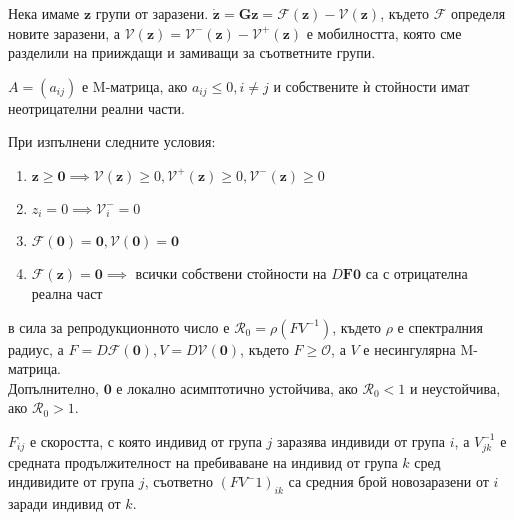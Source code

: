 Нека имаме $\mathbf{z}$ групи от заразени. $\dot{\mathbf{z}} = \mathbf{G}{\mathbf{z}} = \mathscr{F}(\mathbf{z}) - \mathscr{V}(\mathbf{z})$, където $\mathscr{F}$ определя новите заразени, а $\mathscr{V}(\mathbf{z}) = \mathscr{V}^-(\mathbf{z}) - \mathscr{V}^+(\mathbf{z})$ е мобилността, която сме разделили на прииждащи и замиващи за съответните групи.

\begin{definition}[M-матрица]
  $A = (a_{ij})$ е M-матрица, ако $a_{ij} \leq 0, i \neq j$ и собствените ѝ стойности имат неотрицателни реални части.
\end{definition}
\begin{theorem}
  При изпълнени следните условия:
  \begin{enumerate}
    \item $\mathbf{z} \geq \mathbf{0} \implies \mathscr{V}(\mathbf{z}) \geq 0, \mathscr{V}^+(\mathbf{z}) \geq 0, \mathscr{V}^-(\mathbf{z}) \geq 0$
    \item $z_i = 0 \implies \mathscr{V}_{i}^- = 0$
    \item $\mathscr{F}(\mathbf{0}) = \mathbf{0}, \mathscr{V}(\mathbf{0}) = \mathbf{0}$
    \item $\mathscr{F}(\mathbf{z}) = \mathbf{0} \implies$ всички собствени стойности на $D\mathbf{F}{\mathbf{0}}$ са с отрицателна реална част
  \end{enumerate}
  в сила за репродукционното число е $\mathscr{R}_0 = \rho(F V^{-1})$, където $\rho$ е спектралния радиус, а $F = D\mathscr{F}(\mathbf{0}), V = D\mathscr{V}(\mathbf{0})$, където $F \geq \mathscr{O}$, а $V$ е несингулярна M-матрица. \\
  Допълнително, $\mathbf{0}$ е локално асимптотично устойчива, ако $\mathscr{R}_0 < 1$ и неустойчива, ако $\mathscr{R}_0 > 1$.
\end{theorem}

$F_{ij}$ е скоростта, с която индивид от група $j$ заразява индивиди от група $i$, а $V^{-1}_{jk}$ е средната продължителност на пребиваване на индивид от група $k$ сред индивидите от група $j$, съответно $(F V^-1)_{ik}$ са средния брой новозаразени от $i$ заради индивид от $k$.


